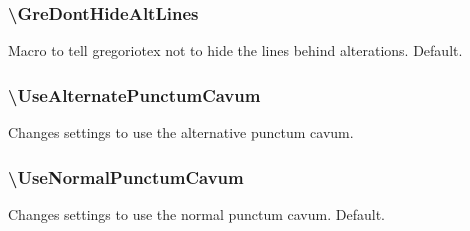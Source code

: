 \subsubsection*{\textbackslash GreDontHideAltLines}
Macro to tell gregoriotex not to hide the lines behind alterations.
Default.

\subsubsection*{\textbackslash UseAlternatePunctumCavum}
Changes settings to use the alternative punctum cavum.

\subsubsection*{\textbackslash UseNormalPunctumCavum}
Changes settings to use the normal punctum cavum.  Default.

